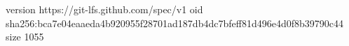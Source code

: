 version https://git-lfs.github.com/spec/v1
oid sha256:bca7e04eaaeda4b920955f28701ad187db4dc7bfeff81d496e4d0f8b39790c44
size 1055
